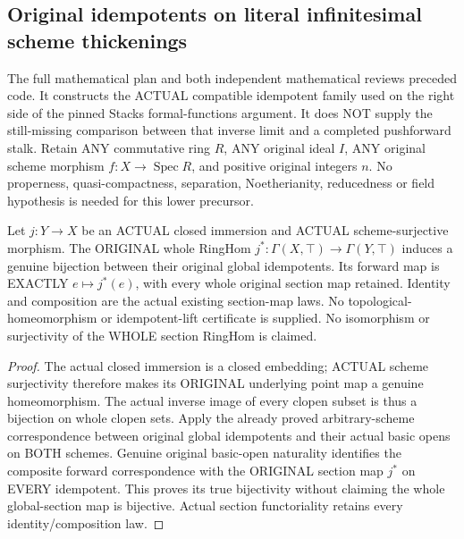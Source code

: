 \subsection{Original idempotents on literal infinitesimal scheme thickenings}

The full mathematical plan and both independent mathematical reviews preceded code. It constructs the ACTUAL
compatible idempotent family used on the right side of the pinned Stacks
formal-functions argument. It does NOT supply the still-missing comparison
between that inverse limit and a completed pushforward stalk. Retain ANY
commutative ring $R$, ANY original ideal $I$, ANY original scheme morphism
$f:X\to\operatorname{Spec}R$, and positive original integers $n$.
No properness, quasi-compactness, separation, Noetherianity, reducedness or
field hypothesis is needed for this lower precursor.

\begin{theorem}
\label{scheme:actual-closed-surjective-global-idempotents}
\leanok
{}
Let $j:Y\to X$ be an ACTUAL closed immersion and ACTUAL scheme-surjective
morphism. The ORIGINAL whole RingHom
$j^*:\Gamma(X,\top)\to\Gamma(Y,\top)$ induces a genuine bijection
between their original global idempotents. Its forward map is EXACTLY
$e\mapsto j^*(e)$, with every whole original section map retained.
Identity and composition are the actual existing section-map laws.
No topological-homeomorphism or idempotent-lift certificate is supplied.
No isomorphism or surjectivity of the WHOLE section RingHom is claimed.
\end{theorem}
\begin{proof}
The actual closed immersion is a closed embedding; ACTUAL scheme
surjectivity therefore makes its ORIGINAL underlying point map a genuine
homeomorphism. The actual inverse image of every clopen subset is thus a
bijection on whole clopen sets. Apply the already proved arbitrary-scheme
correspondence between original global idempotents and their actual basic
opens on BOTH schemes. Genuine original basic-open naturality identifies
the composite forward correspondence with the ORIGINAL section map
$j^*$ on EVERY idempotent. This proves its true bijectivity without
claiming the whole global-section map is bijective. Actual section
functoriality retains every identity/composition law.
\end{proof}

